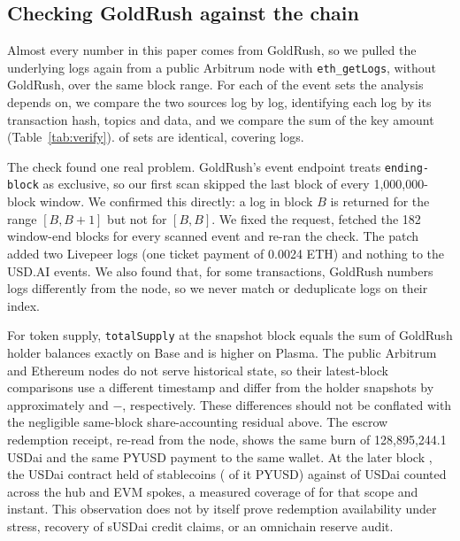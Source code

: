 \subsection{Checking GoldRush against the chain}\label{sec:verify}
Almost every number in this paper comes from GoldRush, so we pulled the underlying logs again from a public Arbitrum node with \texttt{eth\_getLogs}, without GoldRush, over the same block range. For each of the \NVerify{} event sets the analysis depends on, we compare the two sources log by log, identifying each log by its transaction hash, topics and data, and we compare the sum of the key amount (Table~\ref{tab:verify}). \NVerifyMatch{} of \NVerify{} sets are identical, covering \NVerifyLogs{} logs.

The check found one real problem. GoldRush's event endpoint treats \texttt{ending-block} as exclusive, so our first scan skipped the last block of every 1{,}000{,}000-block window. We confirmed this directly: a log in block $B$ is returned for the range $[B, B{+}1]$ but not for $[B, B]$. We fixed the request, fetched the 182 window-end blocks for every scanned event and re-ran the check. The patch added two Livepeer logs (one ticket payment of 0.0024 ETH) and nothing to the USD.AI events. We also found that, for some transactions, GoldRush numbers logs differently from the node, so we never match or deduplicate logs on their index.

For token supply, \texttt{totalSupply} at the snapshot block equals the sum of GoldRush holder balances exactly on Base and is \SupplyGapPlasma{} higher on Plasma. The public Arbitrum and Ethereum nodes do not serve historical state, so their latest-block comparisons use a different timestamp and differ from the holder snapshots by approximately \SupplyGapArbitrum{} and $-$\SupplyGapEth{}, respectively. These differences should not be conflated with the negligible same-block share-accounting residual above. The escrow redemption receipt, re-read from the node, shows the same burn of 128{,}895{,}244.1 USDai and the same PYUSD payment to the same wallet. At the later block \BackingBlock{}, the USDai contract held \USDaiReserves{} of stablecoins (\USDaiPYUSD{} of it PYUSD) against \USDaiSupplyNow{} of USDai counted across the hub and EVM spokes, a measured coverage of \USDaiCoverage{} for that scope and instant. This observation does not by itself prove redemption availability under stress, recovery of sUSDai credit claims, or an omnichain reserve audit.

\begin{table}[t]
\caption{GoldRush data checked against a public Arbitrum node}
\label{tab:verify}
\centering
\scriptsize
\resizebox{\columnwidth}{!}{}
\end{table}

